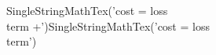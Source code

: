 \documentclass[preview]{standalone}
\begin{document}
\begin{center}
SingleStringMathTex('cost = loss\\ term +')SingleStringMathTex('cost = loss\\ term')
\end{center}
\end{document}
